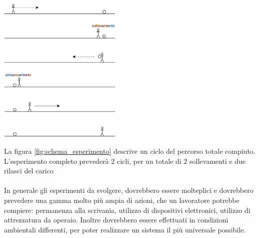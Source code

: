 \documentclass[a4paper, oneside]{book}
\begin{document}
\vspace{6mm}
\begin{minipage}{\linewidth}
\begin{center}
\includegraphics[width=59mm,scale=0.7]{./images/esperimento1.png} 
\vspace{3mm}
\label{fig:schema_esperimento}
\vspace{10mm}
\end{center}
\end{minipage}
La figura \ref{fig:schema_esperimento} descrive un ciclo del percorso totale compiuto. L’esperimento completo prevederà 2 cicli, per un totale di 2 sollevamenti e due rilasci del carico\\ \\
In generale gli esperimenti da svolgere, dovrebbero essere molteplici e dovrebbero prevedere una gamma molto più ampia di azioni, che un lavoratore potrebbe compiere: permanenza alla scrivania, utilizzo di dispositivi elettronici, utilizzo di attrezzatura da operaio. Inoltre dovrebbero essere effettuati in condizioni ambientali differenti, per poter realizzare un sistema il più universale possibile.

\clearpage


\end{document}
